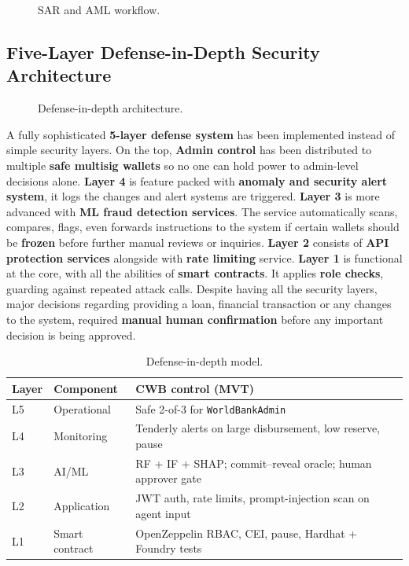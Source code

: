 \begin{figure}[H]
\centering
{}
\caption[SAR and AML workflow]{SAR and AML workflow.}
\label{fig:sar-aml-workflow}
\end{figure}


\subsection{Five-Layer Defense-in-Depth Security Architecture}
\label{sec:defense-in-depth}
\label{sec:contract-security}
\label{sec:fail-closed}

\begin{figure}[H]
\centering
{}
\caption[Defense-in-depth architecture]{Defense-in-depth architecture.}
\label{fig:defense-in-depth}
\end{figure}

A fully sophisticated \textbf{5-layer defense system} has been implemented instead of simple security layers. On the top, \textbf{Admin control} has been distributed to multiple \textbf{safe multisig wallets} so no one can hold power to admin-level decisions alone. \textbf{Layer 4} is feature packed with \textbf{anomaly and security alert system}, it logs the changes and alert systems are triggered. \textbf{Layer 3} is more advanced with \textbf{ML fraud detection services}. The service automatically scans, compares, flags, even forwards instructions to the system if certain wallets should be \textbf{frozen} before further manual reviews or inquiries. \textbf{Layer 2} consists of \textbf{API protection services} alongside with \textbf{rate limiting} service. \textbf{Layer 1} is functional at the core, with all the abilities of \textbf{smart contracts}. It applies \textbf{role checks}, guarding against repeated attack calls. Despite having all the security layers, major decisions regarding providing a loan, financial transaction or any changes to the system, required \textbf{manual human confirmation} before any important decision is being approved.

\begin{table}[H]
\centering
\caption[Defense-in-depth model]{Defense-in-depth model.}
\label{tab:defense-layers}
\small
\begin{tabular}{@{}p{1.2cm}p{3.2cm}p{10.0cm}@{}}
\toprule
\tableheadcolor
\textbf{Layer} & \textbf{Component} & \textbf{CWB control (MVT)} \\
\midrule
L5 & Operational & Safe 2-of-3 for \texttt{WorldBankAdmin} \\
L4 & Monitoring & Tenderly alerts on large disbursement, low reserve, pause \\
L3 & AI/ML & RF + IF + SHAP; commit--reveal oracle; human approver gate \\
L2 & Application & JWT auth, rate limits, prompt-injection scan on agent input \\
L1 & Smart contract & OpenZeppelin RBAC, CEI, pause, Hardhat + Foundry tests \\
\bottomrule
\end{tabular}
\end{table}

